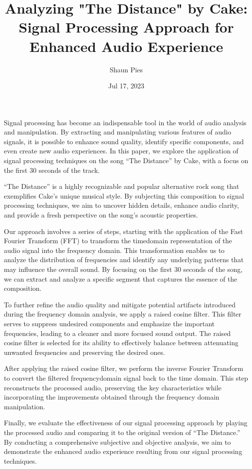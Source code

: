 \documentclass[letterpaper,10pt,english]{jupyterBook}
\title{Analyzing "The Distance" by Cake: Signal Processing Approach for Enhanced Audio Experience}
\date{Jul 17, 2023}
\author{Shaun Pies}
\begin{document}
\pagestyle{empty}
\sphinxmaketitle
\pagestyle{plain}
\sphinxtableofcontents
\pagestyle{normal}
\label{\detokenize{intro::doc}}




\sphinxAtStartPar
Signal processing has become an indispensable tool in the world of audio analysis and manipulation. By extracting and manipulating various features of audio signals, it is possible to enhance sound quality, identify specific components, and even create new audio experiences. In this paper, we explore the application of signal processing techniques on the song “The Distance” by Cake, with a focus on the first 30 seconds of the track.

\sphinxAtStartPar
“The Distance” is a highly recognizable and popular alternative rock song that exemplifies Cake’s unique musical style. By subjecting this composition to signal processing techniques, we aim to uncover hidden details, enhance audio clarity, and provide a fresh perspective on the song’s acoustic properties.

\sphinxAtStartPar
Our approach involves a series of steps, starting with the application of the Fast Fourier Transform (FFT) to transform the time\sphinxhyphen{}domain representation of the audio signal into the frequency domain. This transformation enables us to analyze the distribution of frequencies and identify any underlying patterns that may influence the overall sound. By focusing on the first 30 seconds of the song, we can extract and analyze a specific segment that captures the essence of the composition.

\sphinxAtStartPar
To further refine the audio quality and mitigate potential artifacts introduced during the frequency domain analysis, we apply a raised cosine filter. This filter serves to suppress undesired components and emphasize the important frequencies, leading to a cleaner and more focused sound output. The raised cosine filter is selected for its ability to effectively balance between attenuating unwanted frequencies and preserving the desired ones.

\sphinxAtStartPar
After applying the raised cosine filter, we perform the inverse Fourier Transform to convert the filtered frequency\sphinxhyphen{}domain signal back to the time domain. This step reconstructs the processed audio, preserving the key characteristics while incorporating the improvements obtained through the frequency domain manipulation.

\sphinxAtStartPar
Finally, we evaluate the effectiveness of our signal processing approach by playing the processed audio and comparing it to the original version of “The Distance.” By conducting a comprehensive subjective and objective analysis, we aim to demonstrate the enhanced audio experience resulting from our signal processing techniques.
\end{document}
